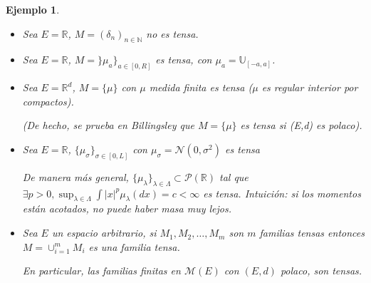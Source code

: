 \documentclass[letterpaper,11pt]{article} %
\theoremstyle{defbreak}
\newtheorem{example}{Ejemplo}[subsection]
\theoremstyle{propbreak}
\theoremstyle{remark}
\theoremstyle{break}
\def\beforeitemize{\leavevmode \vspace{-0.5\baselineskip}}
\begin{document}
\begin{example} %
\label{ejemplo:1_2_3}
\beforeitemize
\begin{itemize}
    \item[(a)] Sea $E=\mathbb{R}$, $M=(\delta_n)_{n\in\mathbb{N}}$ no es tensa.
    \item[(b)] Sea $E=\mathbb{R}$, $M=\}\mu_a\}_{a\in[0,R]}$ es tensa, con $\mu_a=\mathbb{U}_{[-a,a]}$.
    \item[(c)] Sea $E=\mathbb{R}^d$, $M=\{\mu\}$ con $\mu$ medida finita es tensa ($\mu$ es regular interior por compactos).
    
    (De hecho, se prueba en Billingsley \cite{billing} que $M=\{\mu\}$ es tensa si (E,d) es polaco).
    \item[(d)] Sea $E=\mathbb{R}$, $\{\mu_\sigma\}_{\sigma\in[0,L]}$ con $\mu_\sigma=\mathcal{N}(0,\sigma^2)$ es tensa
    
    De manera más general, $\{\mu_\lambda\}_{\lambda\in\Lambda}\subset \mathcal{P}(\mathbb{R})$ tal que $\exists p>0, \displaystyle\sup_{\lambda\in\Lambda}\int|x|^p\mu_\lambda(dx)=c<\infty$ es tensa. Intuición: si los momentos están acotados, no puede haber masa muy lejos.
    \item[(e)] Sea $E$ un espacio arbitrario, si $M_1,M_2,\dots,M_m$ son $m$ familias tensas entonces $M=\displaystyle\cup^m_{i=1}M_i$ es una familia tensa.
    
    En particular, las familias finitas en $\mathcal{M}(E)$ con $(E,d)$ polaco, son tensas.
\end{itemize}
\end{example}
\end{document}
